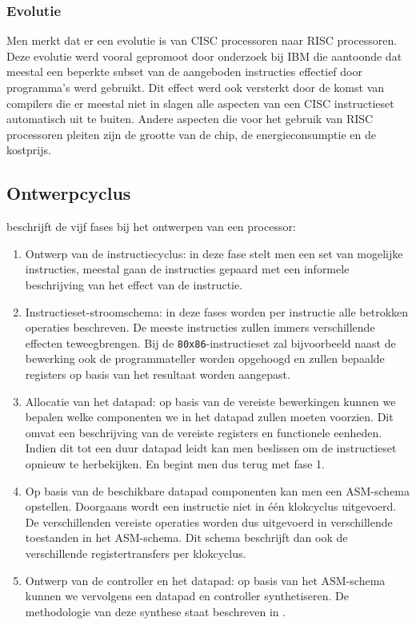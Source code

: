 \subsubsection{Evolutie}
Men merkt dat er een evolutie is van CISC processoren naar RISC processoren. Deze evolutie werd vooral gepromoot door onderzoek bij IBM die aantoonde dat meestal een beperkte subset van de aangeboden instructies effectief door programma's werd gebruikt. Dit effect werd ook versterkt door de komst van compilers die er meestal niet in slagen alle aspecten van een CISC instructieset automatisch uit te buiten. Andere aspecten die voor het gebruik van RISC processoren pleiten zijn de grootte van de chip, de energieconsumptie en de kostprijs.
\subsection{Ontwerpcyclus}
 beschrijft de vijf fases bij het ontwerpen van een processor:
\begin{enumerate}
 \item Ontwerp van de instructiecyclus: in deze fase stelt men een set van mogelijke instructies, meestal gaan de instructies gepaard met een informele beschrijving van het effect van de instructie.
 \item Instructieset-stroomschema: in deze fases worden per instructie alle betrokken operaties beschreven. De meeste instructies zullen immers verschillende effecten teweegbrengen. Bij de \verb+80x86+-instructieset zal bijvoorbeeld naast de bewerking ook de programmateller worden opgehoogd en zullen bepaalde registers op basis van het resultaat worden aangepast.
 \item Allocatie van het datapad: op basis van de vereiste bewerkingen kunnen we bepalen welke componenten we in het datapad zullen moeten voorzien. Dit omvat een beschrijving van de vereiste registers en functionele eenheden. Indien dit tot een duur datapad leidt kan men beslissen om de instructieset opnieuw te herbekijken. En begint men dus terug met fase 1.
 \item Op basis van de beschikbare datapad componenten kan men een ASM-schema opstellen. Doorgaans wordt een instructie niet in \'e\'en klokcyclus uitgevoerd. De verschillenden vereiste operaties worden dus uitgevoerd in verschillende toestanden in het ASM-schema. Dit schema beschrijft dan ook de verschillende registertransfers per klokcyclus.
 \item Ontwerp van de controller en het datapad: op basis van het ASM-schema kunnen we vervolgens een datapad en controller synthetiseren. De methodologie van deze synthese staat beschreven in .
\end{enumerate}
